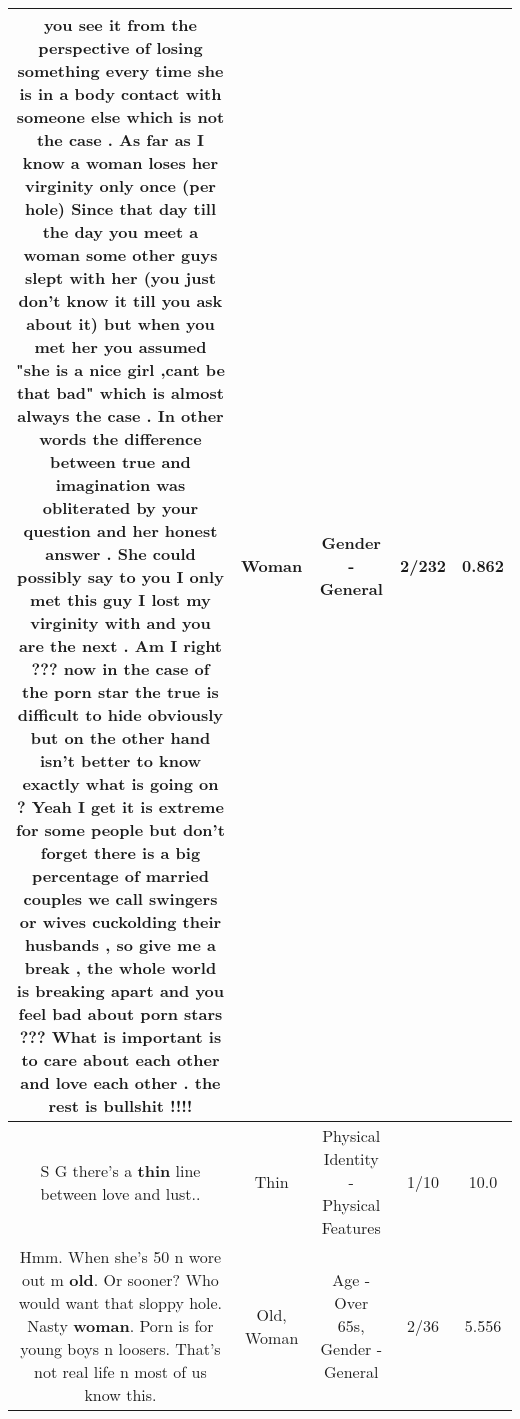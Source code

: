 \documentclass[11pt]{article}
\newlength\mylength
\begin{document}
\begin{center}
\begin{longtable}{|C{.65\mylength}|C{.30\mylength}|C{.12\mylength}|C{.12\mylength}|C{.12\mylength}|}
  \small you see it from the perspective of losing something every time she is in a body contact with someone else which is not the case . As far as I know a \textbf{woman} loses her virginity only once (per hole)  Since that day till the day you meet a \textbf{woman} some other guys slept with her (you just don't know it till you ask about it) but when you met her you assumed "she is a nice girl ,cant be that bad"  which is almost always the case . In other words the difference between true and imagination was obliterated by your question and her honest answer .  She could possibly say to you I only met this guy I lost my virginity with and you are the next . Am I right ??? now in the case of the porn star the true is difficult to hide obviously but on the other hand isn't better to know exactly what is going on ?  Yeah I get it is extreme for some people but don't forget there is a big percentage of married couples we call swingers or wives cuckolding their husbands , so give me a break , the whole world is breaking apart and you feel bad about porn stars  ???  What is important is to care about each other and love each other . the rest is bullshit !!!!\normalsize   & Woman & Gender - General & 2/232 & 0.862 \\  \hline
  \small S G there's a \textbf{thin} line between love and lust..\normalsize   & Thin & Physical Identity - Physical Features & 1/10 & 10.0 \\  \hline
  \small Hmm. When she's 50 n wore out m \textbf{old}. Or sooner? Who would want that sloppy hole. Nasty \textbf{woman}. Porn is for young boys n loosers. That's not real life n most of us know this.\normalsize   & Old, Woman & Age - Over 65s, Gender - General & 2/36 & 5.556 \\  \hline

\end{longtable}
\end{center}
\end{document}
